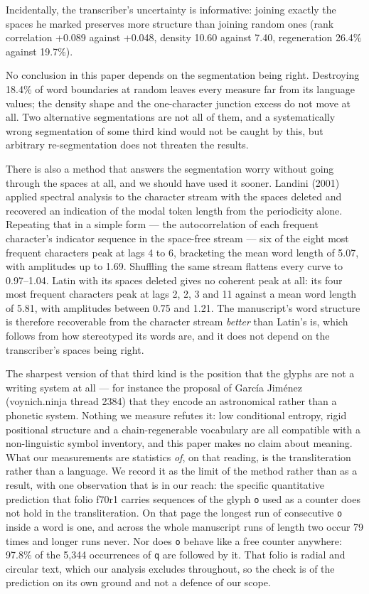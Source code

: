 \documentclass[11pt,a4paper]{article}
\begin{document}
Incidentally, the transcriber's uncertainty is informative: joining exactly the spaces he marked preserves more structure than joining random ones (rank correlation +0.089 against +0.048, density 10.60 against 7.40, regeneration 26.4\% against 19.7\%).


No conclusion in this paper depends on the segmentation being right. Destroying 18.4\% of word boundaries at random leaves every measure far from its language values; the density shape and the one-character junction excess do not move at all. Two alternative segmentations are not all of them, and a systematically wrong segmentation of some third kind would not be caught by this, but arbitrary re-segmentation does not threaten the results.


There is also a method that answers the segmentation worry without going through the spaces at all, and we should have used it sooner. Landini (2001) applied spectral analysis to the character stream with the spaces deleted and recovered an indication of the modal token length from the periodicity alone. Repeating that in a simple form --- the autocorrelation of each frequent character's indicator sequence in the space-free stream --- six of the eight most frequent characters peak at lags 4 to 6, bracketing the mean word length of 5.07, with amplitudes up to 1.69. Shuffling the same stream flattens every curve to 0.97--1.04. Latin with its spaces deleted gives no coherent peak at all: its four most frequent characters peak at lags 2, 2, 3 and 11 against a mean word length of 5.81, with amplitudes between 0.75 and 1.21. The manuscript's word structure is therefore recoverable from the character stream \emph{better} than Latin's is, which follows from how stereotyped its words are, and it does not depend on the transcriber's spaces being right.


The sharpest version of that third kind is the position that the glyphs are not a writing system at all --- for instance the proposal of García Jiménez (voynich.ninja thread 2384) that they encode an astronomical rather than a phonetic system. Nothing we measure refutes it: low conditional entropy, rigid positional structure and a chain-regenerable vocabulary are all compatible with a non-linguistic symbol inventory, and this paper makes no claim about meaning. What our measurements are statistics \emph{of}, on that reading, is the transliteration rather than a language. We record it as the limit of the method rather than as a result, with one observation that is in our reach: the specific quantitative prediction that folio f70r1 carries sequences of the glyph \texttt{o} used as a counter does not hold in the transliteration. On that page the longest run of consecutive \texttt{o} inside a word is one, and across the whole manuscript runs of length two occur 79 times and longer runs never. Nor does \texttt{o} behave like a free counter anywhere: 97.8\% of the 5,344 occurrences of \texttt{q} are followed by it. That folio is radial and circular text, which our analysis excludes throughout, so the check is of the prediction on its own ground and not a defence of our scope.
\end{document}

